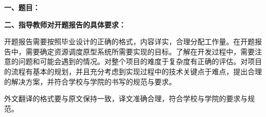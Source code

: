 {
    \setlength{\parindent}{0em}
    \par {\bfseries 一、题目：\uline{\hfill \Title \hfill}}
    \par {\bfseries 二、指导教师对开题报告的具体要求：}
}

开题报告需要按照毕业设计的正确的格式，内容详实，合理分配工作量。在开题报告中，需要确定资源调度原型系统所需要实现的目标。了解在开发过程中，需要注意的问题和可能会遇到的情况。对整个项目的难度于复杂度有正确的评估。对项目的流程有基本的规划，并且充分考虑到实现过程中的技术关键点于难点，提出合理的解决方案，并符合学校与学院的书写的规范与要求。

外文翻译的格式要与原文保持一致，译文准确合理，符合学校与学院的要求与规范。

\mbox{} \vfill

\signature{指导教师（签名）}
